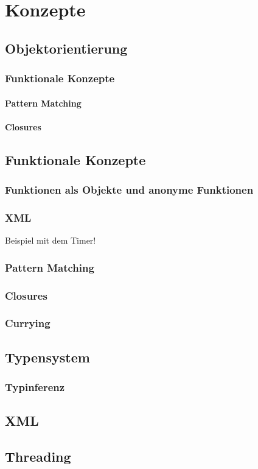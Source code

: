 \chapter{Konzepte}

\section{Objektorientierung}

\subsection{Funktionale Konzepte}

\subsubsection{Pattern Matching}

\subsubsection{Closures}


\section{Funktionale Konzepte}

\subsection{Funktionen als Objekte und anonyme Funktionen}

\subsection{XML}


Beispiel mit dem Timer!

\subsection{Pattern Matching}

\subsection{Closures}

\subsection{Currying}

\section{Typensystem}

\subsection{Typinferenz}

\section{XML}

\section{Threading}
